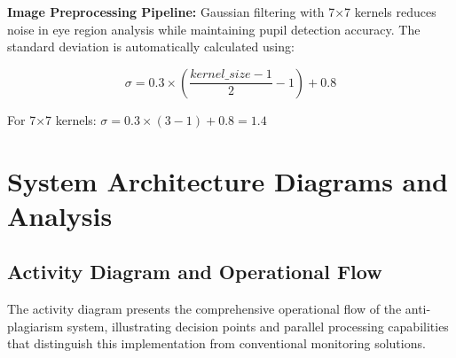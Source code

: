 \documentclass[conference]{IEEEtran}
\begin{document}
\textbf{Image Preprocessing Pipeline:} Gaussian filtering with 7×7 kernels reduces noise in eye region analysis while maintaining pupil detection accuracy. The standard deviation is automatically calculated using:

\begin{equation}
\sigma = 0.3 \times \left(\frac{kernel\_size - 1}{2} - 1\right) + 0.8
\end{equation}

For 7×7 kernels: $\sigma = 0.3 \times (3-1) + 0.8 = 1.4$

\section{System Architecture Diagrams and Analysis}

\subsection{Activity Diagram and Operational Flow}

The activity diagram presents the comprehensive operational flow of the anti-plagiarism system, illustrating decision points and parallel processing capabilities that distinguish this implementation from conventional monitoring solutions.
\end{document}
